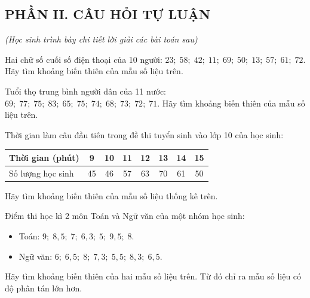 \vspace{0.4cm}
\subsection*{PHẦN II. CÂU HỎI TỰ LUẬN}
\textit{\small (Học sinh trình bày chi tiết lời giải các bài toán sau)}


\begin{bt}
	Hai chữ số cuối số điện thoại của 10 người: $23;\; 58;\; 42;\; 11;\; 69;\; 50;\; 13;\; 57;\; 61;\; 72$. Hãy tìm khoảng biến thiên của mẫu số liệu trên.
\end{bt}

\begin{bt}
	Tuổi thọ trung bình người dân của 11 nước: $69;\; 77;\; 75;\; 83;\; 65;\; 75;\; 74;\; 68;\; 73;\; 72;\; 71$. Hãy tìm khoảng biến thiên của mẫu số liệu trên.
\end{bt}

\begin{bt}
	Thời gian làm câu đầu tiên trong đề thi tuyển sinh vào lớp 10 của học sinh:
	\begin{center}
	\begin{tabular}{|l|c|c|c|c|c|c|c|}
		\hline
		Thời gian (phút) & 9 & 10 & 11 & 12 & 13 & 14 & 15 \\
		\hline
		Số lượng học sinh & 45 & 46 & 57 & 63 & 70 & 61 & 50 \\
		\hline
	\end{tabular}
	\end{center}
	Hãy tìm khoảng biến thiên của mẫu số liệu thống kê trên.
\end{bt}

\begin{bt}
	Điểm thi học kì 2 môn Toán và Ngữ văn của một nhóm học sinh:
	\begin{itemize}
		\item Toán: $9;\; 8{,}5;\; 7;\; 6{,}3;\; 5;\; 9{,}5;\; 8$.
		\item Ngữ văn: $6;\; 6{,}5;\; 8;\; 7{,}3;\; 5{,}5;\; 8{,}3;\; 6{,}5$.
	\end{itemize}
	Hãy tìm khoảng biến thiên của hai mẫu số liệu trên. Từ đó chỉ ra mẫu số liệu có độ phân tán lớn hơn.
\end{bt}

